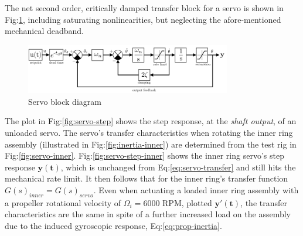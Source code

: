 \par
The net second order, critically damped transfer block for a servo is shown in Fig:\ref{fig:servo-block}, including saturating nonlinearities, but neglecting the afore-mentioned mechanical deadband.
\begin{figure}[hbtp]
\centering
\includegraphics[width=0.8\textwidth]{figs/servo-block}
\vspace{-5pt}
\caption{Servo block diagram}
\label{fig:servo-block}
\vspace{-15pt}
\end{figure}
\par
The plot in Fig:\ref{fig:servo-step} shows the step response, at the \emph{shaft output}, of an unloaded servo. The servo's transfer characteristics when rotating the inner ring assembly (illustrated in Fig:\ref{fig:inertia-inner}) are determined from the test rig in Fig:\ref{fig:servo-inner}. Fig:\ref{fig:servo-step-inner} shows the inner ring servo's step response {\color{Blue}$\mathbf{y(t)}$}, which is unchanged from Eq:\ref{eq:servo-transfer} and still hits the mechanical rate limit. It then follows that for the inner ring's transfer function $G(s)_{inner}=G(s)_{servo}$. Even when actuating a loaded inner ring assembly with a propeller rotational velocity of $\Omega_i=6000$ RPM, plotted {\color{Red}$\mathbf{y'(t)}$}, the transfer characteristics are the same in spite of a further increased load on the assembly due to the induced gyroscopic response, Eq:\ref{eq:prop-inertia}.
